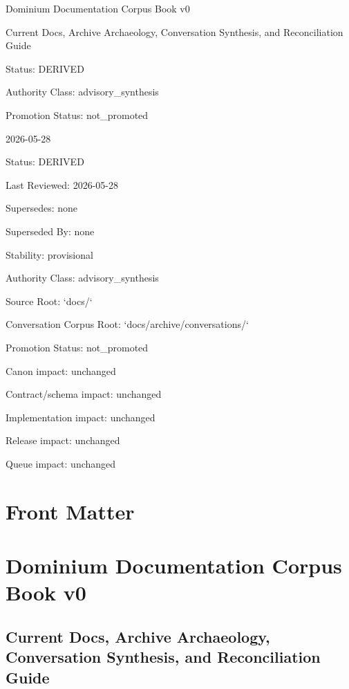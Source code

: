 \documentclass[11pt,a4paper]{report}
\begin{document}
\begin{titlepage}
\centering
\vspace*{2cm}
{\Huge Dominium Documentation Corpus Book v0\par}
\vspace{1cm}
{\Large Current Docs, Archive Archaeology, Conversation Synthesis, and Reconciliation Guide\par}
\vspace{1.5cm}
{\large Status: DERIVED\par}
{\large Authority Class: advisory\_synthesis\par}
{\large Promotion Status: not\_promoted\par}
\vfill
{\large 2026-05-28\par}
\end{titlepage}
\tableofcontents
\clearpage
\raggedright
Status: DERIVED

Last Reviewed: 2026-\allowbreak{}05-\allowbreak{}28

Supersedes: none

Superseded By: none

Stability: provisional

Authority Class: advisory\_synthesis

Source Root: `docs/\allowbreak{}`

Conversation Corpus Root: `docs/\allowbreak{}archive/\allowbreak{}conversations/\allowbreak{}`

Promotion Status: not\_promoted

Canon impact: unchanged

Contract/\allowbreak{}schema impact: unchanged

Implementation impact: unchanged

Release impact: unchanged

Queue impact: unchanged


\chapter{Front Matter}

\chapter{Dominium Documentation Corpus Book v0}

\section{Current Docs, Archive Archaeology, Conversation Synthesis, and Reconciliation Guide}
\end{document}
